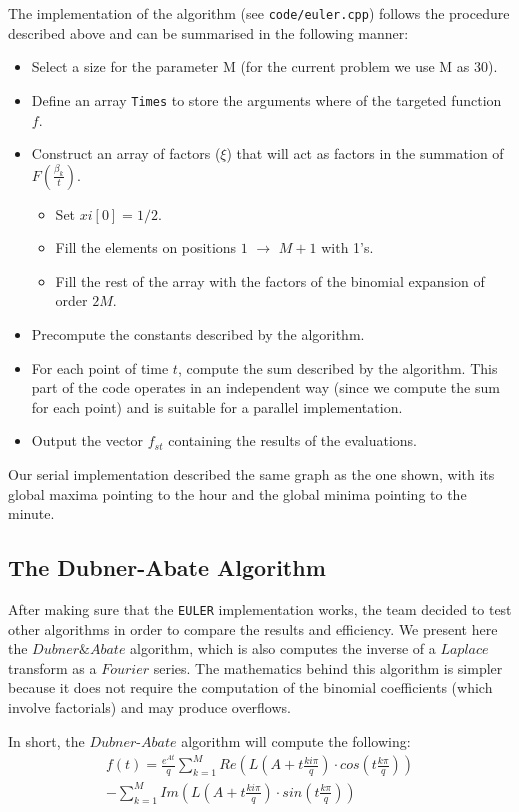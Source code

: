 The implementation of the algorithm (see \texttt{code/euler.cpp}) follows the procedure described above and can be summarised in the following manner:
\begin{itemize}
\item{Select a size for the parameter M (for the current problem we use M as 30).}
\item{Define an array \texttt{Times} to store the arguments where of the targeted function $f$.}
\item{Construct an array of factors ($\xi$) that will act as factors in the summation of $F(\frac{\beta_k}{t})$.

	\begin{itemize}
	\item Set $xi[0] = 1/2$.
	\item Fill the elements on positions $1$ $\to$ $M+1$ with 1's.
	\item Fill the rest of the array with the factors of the binomial expansion of order $2M$.
	\end{itemize}
}
\item{Precompute the constants described by the algorithm.}
\item{For each point of time $t$, compute the sum described by the algorithm. This part of the code operates in an independent way (since we compute the sum for each point) and is suitable for a parallel implementation.}
\item{Output the vector $f_{st}$ containing the results of the evaluations.}
\end{itemize} 

Our serial implementation described the same graph as the one shown, with its global maxima pointing to the hour and the global minima pointing to the minute.


\subsection{The Dubner-Abate Algorithm}
After making sure that the \texttt{EULER} implementation works, the team decided to test other algorithms in order to compare the results and efficiency.
We present here the $Dubner \& Abate$ algorithm, which is also computes the inverse of a $Laplace$ transform as a $Fourier$ series.
The mathematics behind this algorithm is simpler because it does not require the computation of the binomial coefficients (which involve factorials) and may produce overflows.

In short, the $Dubner$-$Abate$ algorithm will compute the following:
\begin{align*}
f(t) = \frac{e^{At}}{q} \sum\limits_{k=1}^{M}{Re(L(A+t\frac{ki\pi}{q}) \cdot cos(t\frac{k\pi}{q}))} \\
- \sum\limits_{k=1}^{M}{Im(L(A+t\frac{ki\pi}{q}) \cdot sin(t\frac{k\pi}{q}) )}
\end{align*}
\newline

